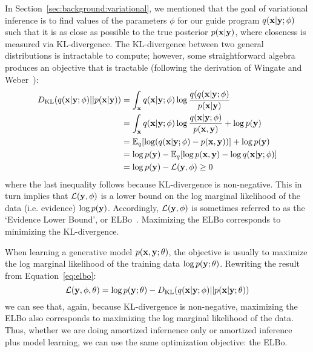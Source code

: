 In Section~\ref{sec:background:variational}, we mentioned that the goal of variational inference is to find values of the parameters $\phi$ for our guide program $q(\mathbf{x} | \mathbf{y} ; \phi)$ such that it is as close as possible to the true posterior $p(\mathbf{x} | \mathbf{y})$, where closeness is measured via KL-divergence. The KL-divergence between two general distributions is intractable to compute; however, some straightforward algebra produces an objective that is tractable (following the derivation of Wingate and Weber~\cite{AVIPP}):
\begin{align}
\begin{split}
D_{\text{KL}}(q(\mathbf{x} | \mathbf{y} ; \phi) || p(\mathbf{x} | \mathbf{y}))
&= \int_{\mathbf{x}} q(\mathbf{x} | \mathbf{y} ; \phi) \log \frac{q(q(\mathbf{x} | \mathbf{y} ; \phi)}{p(\mathbf{x} | \mathbf{y})}\\
&= \int_{\mathbf{x}} q(\mathbf{x} | \mathbf{y} ; \phi) \log \frac{q(\mathbf{x} | \mathbf{y} ; \phi)}{p(\mathbf{x}, \mathbf{y})} + \log p(\mathbf{y})\\
&= \mathbb{E}_{q}[ \log(q(\mathbf{x} | \mathbf{y} ; \phi) -  p(\mathbf{x}, \mathbf{y}) ) ] + \log p(\mathbf{y})\\
&= \log p(\mathbf{y}) - \mathbb{E}_{q}[ \log p(\mathbf{x}, \mathbf{y}) - \log q(\mathbf{x} | \mathbf{y} ; \phi) ]\\
&= \log p(\mathbf{y}) - \mathcal{L}(\mathbf{y}, \phi) \geq 0
\end{split}
\label{eq:elbo}
\end{align}
where the last inequality follows because KL-divergence is non-negative. This in turn implies that $\mathcal{L}(\mathbf{y}, \phi)$ is a lower bound on the log marginal likelihood of the data (i.e. evidence) $\log p(\mathbf{y})$. Accordingly, $\mathcal{L}(\mathbf{y}, \phi)$ is sometimes referred to as the `Evidence Lower Bound', or ELBo~\cite{BBVI}. Maximizing the ELBo corresponds to minimizing the KL-divergence.

When learning a generative model $p(\mathbf{x}, \mathbf{y}; \theta)$, the objective is usually to maximize the log marginal likelihood of the training data $\log p(\mathbf{y} ; \theta)$. Rewriting the result from Equation~\ref{eq:elbo}:
\begin{equation*}
\mathcal{L}(\mathbf{y}, \phi, \theta) = \log p(\mathbf{y} ; \theta) - D_{\text{KL}}(q(\mathbf{x} | \mathbf{y} ; \phi) || p(\mathbf{x} | \mathbf{y} ; \theta))
\end{equation*}
we can see that, again, because KL-divergence is non-negative, maximizing the ELBo also corresponds to maximizing the log marginal likelihood of the data. Thus, whether we are doing amortized infernence only or amortized inference plus model learning, we can use the same optimization objective: the ELBo.

